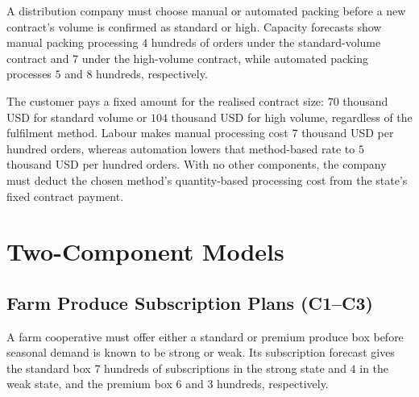 	A distribution company must choose manual or automated packing before a new contract's volume is confirmed as standard or high. Capacity forecasts show manual packing processing \(4\) hundreds of orders under the standard-volume contract and \(7\) under the high-volume contract, while automated packing processes \(5\) and \(8\) hundreds, respectively.

	The customer pays a fixed amount for the realised contract size: \(70\) thousand USD for standard volume or \(104\) thousand USD for high volume, regardless of the fulfilment method. Labour makes manual processing cost \(7\) thousand USD per hundred orders, whereas automation lowers that method-based rate to \(5\) thousand USD per hundred orders. With no other components, the company must deduct the chosen method's quantity-based processing cost from the state's fixed contract payment.

	\section{Two-Component Models}
	\label{sec:two-component-models}


	\subsection{Farm Produce Subscription Plans (C1--C3)}
	\label{sec:problem9-farm-produce-subscription-c1-c3}

	A farm cooperative must offer either a standard or premium produce box before seasonal demand is known to be strong or weak. Its subscription forecast gives the standard box \(7\) hundreds of subscriptions in the strong state and \(4\) in the weak state, and the premium box \(6\) and \(3\) hundreds, respectively.

